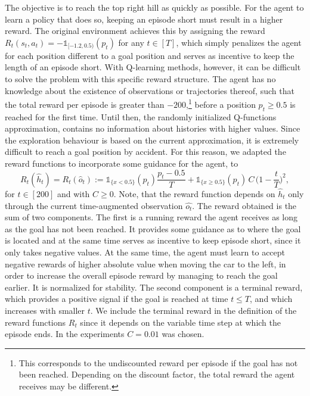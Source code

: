 \documentclass[
    a4paper,
    11pt,
    bibliography=totoc,
    listof=totoc,      
    headinclude=true,
    cleardoublepage=empty,
]{scrbook}
\theoremstyle{plain}
\theoremstyle{definition}
\theoremstyle{remark}
\begin{document}
The objective is to reach the top right hill as quickly as possible. For the
agent to learn a policy that does so, keeping an episode short must result in
a higher reward. The original environment achieves this by assigning the
reward $R_t(s_t, a_t) = -\mathds{1}_{[-1.2, 0.5)}(p_t)$ for any $t\in[T]$,
which simply penalizes the agent for each position different to a goal
position and serves as incentive to keep the length of an episode short. With
Q-learning methods, however, it can be difficult to solve the problem with
this specific reward structure. The agent has no knowledge about the existence
of observations or trajectories thereof, such that the total reward
per episode is greater than $-200$,\footnote{
    This corresponds to the undiscounted reward per episode if the goal has not been reached. Depending on the discount factor, the total reward the agent receives may be different.
} before a position $p_t \geq 0.5$ is reached
for the first time. Until then, the randomly initialized Q-functions
approximation, contains no information about histories with higher values.
Since the exploration behaviour is based on the current approximation, it
is extremely difficult to reach a goal position by accident. For this reason,
we adapted the reward functions to incorporate some guidance for the agent, to
\begin{equation}
\label{eq:MountainCarReward}
    R_t(\hat{h}_t) = R_t(\hat{o}_t)
    := \mathds{1}_{\{x<0.5\}}(p_t) \frac{p_t - 0.5}{T} 
        + \mathds{1}_{\{x\geq0.5\}}(p_t)\,C\,\bigl(1-\frac{t}{T}\bigr)^2,
\end{equation}
for $t\in[200]$ and
with $C\geq 0$. Note, that the reward function depends on $\hat{h}_t$ only
through the current time-augmented observation $\hat{o_t}$. The reward
obtained is the sum of two components. The first is a running reward the agent
receives as long as the goal has not been reached. It provides some guidance
as to where the goal is located and at the same time serves as incentive to
keep episode short, since it only takes negative values. At the same time, the
agent must learn to accept negative rewards of higher absolute value when
moving the car to the left, in order to increase the overall episode reward by
managing to reach the goal earlier. It is normalized for stability. The second
component is a terminal reward, which provides a positive signal if the goal
is reached at time $t\leq T$, and which increases with smaller $t$. We include
the terminal reward in the definition of the reward functions $R_t$ since it
depends on the variable time step at which the episode ends. In the
experiments $C=0.01$ was chosen.
\end{document}

